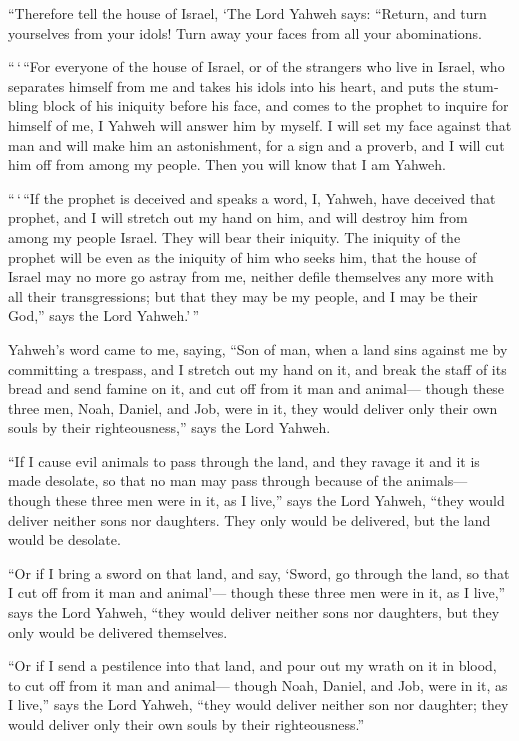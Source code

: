 \begin{paracol}{2}
\begin{otherlanguage}{english}
 ``Therefore tell the house of Israel, `The Lord Yahweh
says: ``Return, and turn yourselves from your idols! Turn away your
faces from all your abominations.

 ``\,`\,``For everyone of the house of Israel, or of the
strangers who live in Israel, who separates himself from me and takes
his idols into his heart, and puts the stumbling block of his iniquity
before his face, and comes to the prophet to inquire for himself of me,
I Yahweh will answer him by myself.  I will set my face
against that man and will make him an astonishment, for a sign and a
proverb, and I will cut him off from among my people. Then you will know
that I am Yahweh.

 ``\,`\,``If the prophet is deceived and speaks a word, I,
Yahweh, have deceived that prophet, and I will stretch out my hand on
him, and will destroy him from among my people Israel. 
They will bear their iniquity. The iniquity of the prophet will be even
as the iniquity of him who seeks him,  that the house of
Israel may no more go astray from me, neither defile themselves any more
with all their transgressions; but that they may be my people, and I may
be their God,'' says the Lord Yahweh.'\,''

 Yahweh's word came to me, saying,  ``Son
of man, when a land sins against me by committing a trespass, and I
stretch out my hand on it, and break the staff of its bread and send
famine on it, and cut off from it man and animal--- 
though these three men, Noah, Daniel, and Job, were in it, they would
deliver only their own souls by their righteousness,'' says the Lord
Yahweh.

 ``If I cause evil animals to pass through the land, and
they ravage it and it is made desolate, so that no man may pass through
because of the animals---  though these three men were in
it, as I live,'' says the Lord Yahweh, ``they would deliver neither sons
nor daughters. They only would be delivered, but the land would be
desolate.

 ``Or if I bring a sword on that land, and say, `Sword,
go through the land, so that I cut off from it man and animal'---
 though these three men were in it, as I live,'' says the
Lord Yahweh, ``they would deliver neither sons nor daughters, but they
only would be delivered themselves.

 ``Or if I send a pestilence into that land, and pour out
my wrath on it in blood, to cut off from it man and animal---
 though Noah, Daniel, and Job, were in it, as I live,''
says the Lord Yahweh, ``they would deliver neither son nor daughter;
they would deliver only their own souls by their righteousness.''


\end{otherlanguage}
\end{paracol}
